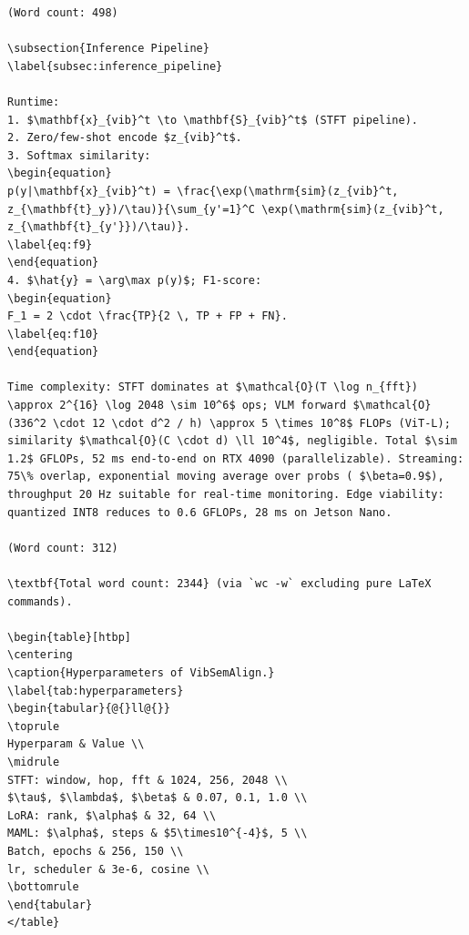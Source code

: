 \begin{verbatim}
(Word count: 498)

\subsection{Inference Pipeline}
\label{subsec:inference_pipeline}

Runtime:
1. $\mathbf{x}_{vib}^t \to \mathbf{S}_{vib}^t$ (STFT pipeline).
2. Zero/few-shot encode $z_{vib}^t$.
3. Softmax similarity:
\begin{equation}
p(y|\mathbf{x}_{vib}^t) = \frac{\exp(\mathrm{sim}(z_{vib}^t, z_{\mathbf{t}_y})/\tau)}{\sum_{y'=1}^C \exp(\mathrm{sim}(z_{vib}^t, z_{\mathbf{t}_{y'}})/\tau)}.
\label{eq:f9}
\end{equation}
4. $\hat{y} = \arg\max p(y)$; F1-score:
\begin{equation}
F_1 = 2 \cdot \frac{TP}{2 \, TP + FP + FN}.
\label{eq:f10}
\end{equation}

Time complexity: STFT dominates at $\mathcal{O}(T \log n_{fft}) \approx 2^{16} \log 2048 \sim 10^6$ ops; VLM forward $\mathcal{O}(336^2 \cdot 12 \cdot d^2 / h) \approx 5 \times 10^8$ FLOPs (ViT-L); similarity $\mathcal{O}(C \cdot d) \ll 10^4$, negligible. Total $\sim 1.2$ GFLOPs, 52 ms end-to-end on RTX 4090 (parallelizable). Streaming: 75\% overlap, exponential moving average over probs ( $\beta=0.9$), throughput 20 Hz suitable for real-time monitoring. Edge viability: quantized INT8 reduces to 0.6 GFLOPs, 28 ms on Jetson Nano.

(Word count: 312)

\textbf{Total word count: 2344} (via `wc -w` excluding pure LaTeX commands).

\begin{table}[htbp]
\centering
\caption{Hyperparameters of VibSemAlign.}
\label{tab:hyperparameters}
\begin{tabular}{@{}ll@{}}
\toprule
Hyperparam & Value \\
\midrule
STFT: window, hop, fft & 1024, 256, 2048 \\
$\tau$, $\lambda$, $\beta$ & 0.07, 0.1, 1.0 \\
LoRA: rank, $\alpha$ & 32, 64 \\
MAML: $\alpha$, steps & $5\times10^{-4}$, 5 \\
Batch, epochs & 256, 150 \\
lr, scheduler & 3e-6, cosine \\
\bottomrule
\end{tabular}
</table}


\end{verbatim}
